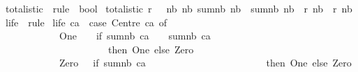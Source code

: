 \begin{isabellebody}
\ totalistic\ {\isacharcolon}{\isacharcolon}\ {\isachardoublequoteopen}rule\ {\isasymRightarrow}\ bool{\isachardoublequoteclose}\ \isanewline
{\isachardoublequoteopen}totalistic\ r\ {\isasymequiv}\ {\isacharparenleft}{\isasymforall}\ nb{}\ nb{}{\isachardot}\ sum{\isacharunderscore}nb\ nb{}\ {\isacharequal}\ sum{\isacharunderscore}nb\ nb{}\ {\isasymlongrightarrow}\ {\isacharparenleft}r\ nb{}{\isacharparenright}\ {\isacharequal}\ {\isacharparenleft}r\ nb{}{\isacharparenright}{\isacharparenright}{\isachardoublequoteclose}%
\isadelimdocument
%
\endisadelimdocument
%
\isatagdocument
%
\isamarkuptrue%
%
\endisatagdocument
{\isafolddocument}%
%
\isadelimdocument
%
\endisadelimdocument
{}\isamarkupfalse%
\ life\ {\isacharcolon}{\isacharcolon}\ rule\ \isanewline
{\isachardoublequoteopen}life\ ca\ {\isacharequal}\ {\isacharparenleft}case\ {\isacharparenleft}Centre\ ca{\isacharparenright}\ of\isanewline
\ \ \ \ \ \ \ \ \ \ \ \ One\ \ \ {\isasymRightarrow}\ {\isacharparenleft}if\ {\isacharparenleft}sum{\isacharunderscore}nb\ ca{\isacharparenright}\ {\isacharequal}\ {}\ {\isasymor}\ {\isacharparenleft}sum{\isacharunderscore}nb\ ca{\isacharparenright}\ {\isacharequal}\ {}\isanewline
\ \ \ \ \ \ \ \ \ \ \ \ \ \ \ \ \ \ \ \ \ \ then\ One\ else\ Zero{\isacharparenright}\ {\isacharbar}\isanewline
\ \ \ \ \ \ \ \ \ \ \ \ Zero\ \ {\isasymRightarrow}\ {\isacharparenleft}if\ {\isacharparenleft}sum{\isacharunderscore}nb\ ca{\isacharparenright}\ {\isacharequal}\ {}\isanewline
\ \ \ \ \ \ \ \ \ \ \ \ \ \ \ \ \ \ \ \ \ \ then\ One\ else\ Zero{\isacharparenright}{\isacharparenright}{\isachardoublequoteclose}\isanewline
%
\isadelimtheory
%
\endisadelimtheory
%
\isatagtheory
{}\isamarkupfalse%
%
\endisatagtheory
{\isafoldtheory}%
%
\isadelimtheory
%
\endisadelimtheory
%
\end{isabellebody}%
\endinput
